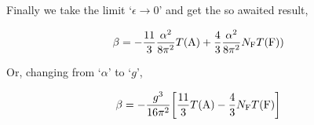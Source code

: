 Finally we take the limit `$\epsilon\rightarrow 0$' and get the so awaited result,

\begin{align}
    \beta&=-\frac{11}{3}\frac{\alpha^2}{8\pi^2}T\qty(\textnormal{A})
    +\frac43\frac{\alpha^2}{8\pi^2}N_{\textnormal{F}}T\qty(\textnormal{F}))\nonumber
\end{align}

Or, changing from `$\alpha$' to `$g$',

\begin{align}
    \beta&=-\frac{g^3}{16\pi^2}\qty[\frac{11}{3}T\qty(\textnormal{A})
    -\frac43N_{\textnormal{F}}T\qty(\textnormal{F})]\nonumber
\end{align}